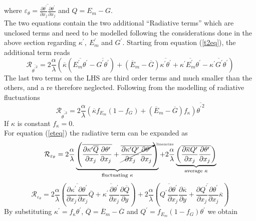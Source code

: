 \documentclass[10pt]{article}
\def\lp{\left(}
\def\rp{\right)}
\def\tp{\overline{{\theta^\prime}^2}}
\def\tr{{\theta^\prime}}
\def\et{{\varepsilon_{\theta}}}
\begin{document}
where $\et = \overline{\frac{\partial \tr}{\partial x_j}\frac{\partial \tr}{\partial x_j}}$ and $Q = E_m - G$. \\
The two equations contain the two additional \enquote{Radiative terms} which are unclosed terms and need to be modelled following the considerations done in the above section regarding $\kappa^\prime, \ E_m^\prime$ and $G^\prime$. Starting from equation (\ref{t2eq}), the additional term reads
\begin{equation*}
\mathcal{R}_{\tp} = 2\frac{\alpha}{\lambda} \lp \overline{\kappa} (\overline{E_m^\prime \tr}-\overline{G^\prime \tr}) + (\overline{E}_m - \overline{G})\overline{\kappa^\prime \tr} + \overline{\kappa^\prime E_m^\prime \tr} - \overline{\kappa^\prime G^\prime \tr} \rp
\end{equation*}
The last two terms on the LHS are third order terms and much smaller than the others, and a re therefore neglected. Following from the modelling of radiative fluctuations
\begin{equation*}
\mathcal{R}_{\tp} = 2\frac{\alpha}{\lambda} \lp \overline{\kappa} f_{E_m}(1 - f_G ) + (\overline{E}_m - \overline{G})f_{\kappa} \rp \tp
\end{equation*}
If $\kappa$ is constant $f_{\kappa} = 0$.\\
For equation (\ref{eteq}) the radiative term can be expanded as
\begin{equation*}
\mathcal{R}_{\et} = 2\frac{\alpha}{\lambda} \underbrace{ \lp \overline{\frac{\partial \kappa^\prime \overline{Q}}{\partial x_j}\frac{\partial \tr}{\partial x_j}}+\cancelto{\text{\tiny{linearize}}}{\overline{\frac{\partial \kappa^\prime Q^\prime}{\partial x_j}\frac{\partial \tr}{\partial x_j}}}\rp}_{\text{fluctuating }\kappa } + 2\frac{\alpha}{\lambda} \underbrace{ \lp \overline{\frac{\partial \overline{\kappa} Q^\prime}{\partial x_j}\frac{\partial \tr}{\partial x_j}} \rp}_{\text{average } \kappa }  
\end{equation*}
\begin{equation*}
\mathcal{R}_{\et} = 2\frac{\alpha}{\lambda} \lp \overline{\frac{\partial \kappa^\prime}{\partial x_j}\frac{\partial \tr}{\partial x_j}}\overline{Q} +\overline{\kappa^\prime\frac{\partial \tr}{\partial x_j}} \frac{\partial \overline{Q}}{\partial y}\rp + 2\frac{\alpha}{\lambda} \lp \overline{ Q^\prime\frac{\partial \tr}{\partial x_j}}\frac{\partial \overline{\kappa}}{\partial y}  +
 \overline{\frac{\partial Q^\prime}{\partial x_j}\frac{\partial \tr}{\partial x_j}}\overline{\kappa} \rp  
\end{equation*}
By substituting $\kappa^\prime = f_{\kappa} \tr$, $\overline{Q} = \overline{E}_m - \overline{G}$ and $Q^\prime = f_{E_m}(1-f_G) \tr$ we obtain
\end{document}
